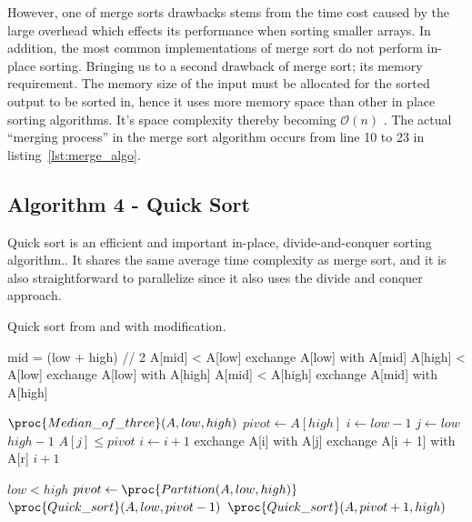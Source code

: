 \documentclass[sigconf, nonacm, natbib, screen, balance=False]{acmart}
\begin{document}
However, one of merge sorts drawbacks stems from the time cost caused by the large overhead which effects its performance when sorting smaller arrays. In addition, the most common implementations of merge sort do not perform in-place sorting. Bringing us to a second drawback of merge sort; its memory requirement. The memory size of the input must be allocated for the sorted output to be sorted in, hence it uses more memory space than other in place sorting algorithms. It's space complexity thereby becoming $\mathcal{O}(n)$ \cite{Mergeins20:online}. The actual ``merging process'' in the merge sort algorithm occurs from line 10 to 23 in listing~\ref{lst:merge_algo}.


\subsection{Algorithm 4 - Quick Sort}\label{sec:algo4}
Quick sort is an efficient and important in-place, divide-and-conquer sorting algorithm.\citet[Ch.~7.1]{CLRS_2009}. It shares the same average time complexity as merge sort, and it is also straightforward to parallelize since it also uses the divide and conquer approach.
\begin{listing}
  \caption{Quick sort from \citet[Ch.~7.2, p. 173]{CLRS_2009} and \cite{Quicksor12:online} with modification.}
  \label{lst:quick_algo}
  
 \begin{codebox}
    \li mid = (low + high) // 2
    \li \If A[mid] < A[low]
    \li \Do
    exchange A[low] with A[mid]
    \End
    \li \If A[high] < A[low]
    \li \Do
    exchange A[low] with A[high]
    \End
    \li \If A[mid] < A[high]
    \li \Do
    exchange A[mid] with A[high]
  \end{codebox}

  \begin{codebox}
    \li $\proc{Median\_of\_three}(A, low, high)$
    \li $pivot \gets A[high]$
    \li $i \gets low - 1$
    \li \For $j \gets low $ \To $high -1$ 
    \li \Do
    \If $A[j] \leq pivot$
    \li \Do
    $i \gets i + 1$
    \li exchange A[i] with A[j]
    \End
    \End
    \li exchange A[i + 1] with A[r]
    \li \Return $i +1$
  \end{codebox}

  \begin{codebox}
    \li \If $low < high$
    \li \Do
    $pivot \gets \proc{Partition(A, low, high)}$
    \li $\proc{Quick\_sort}(A, low, pivot-1)$
    \li $\proc{Quick\_sort}(A, pivot+1, high)$
  \end{codebox}

\end{listing}
\end{document}
